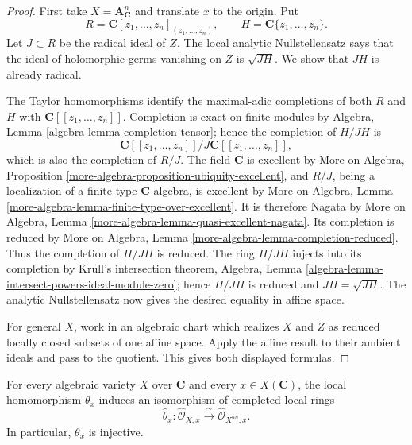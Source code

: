 \begin{proof}
First take $X=\mathbf A^n_{\mathbf C}$ and translate $x$ to the origin. Put
$$
R=\mathbf C[z_1,\ldots,z_n]_{(z_1,\ldots,z_n)},
\qquad
H=\mathbf C\{z_1,\ldots,z_n\}.
$$
Let $J \subset R$ be the radical ideal of $Z$. The local analytic
Nullstellensatz says that the ideal of holomorphic germs vanishing on $Z$ is
$\sqrt{JH}$. We show that $JH$ is already radical.

The Taylor homomorphisms identify the maximal-adic completions of both $R$ and
$H$ with $\mathbf C[[z_1,\ldots,z_n]]$. Completion is exact on finite modules
by Algebra, Lemma \ref{algebra-lemma-completion-tensor}; hence the completion
of $H/JH$ is
$$
\mathbf C[[z_1,\ldots,z_n]]/
J\mathbf C[[z_1,\ldots,z_n]],
$$
which is also the completion of $R/J$. The field $\mathbf C$ is excellent by
More on Algebra, Proposition
\ref{more-algebra-proposition-ubiquity-excellent}, and $R/J$, being a
localization of a finite type $\mathbf C$-algebra, is excellent by More on
Algebra, Lemma \ref{more-algebra-lemma-finite-type-over-excellent}. It is
therefore Nagata by More on Algebra, Lemma
\ref{more-algebra-lemma-quasi-excellent-nagata}. Its
completion is reduced by More on Algebra, Lemma
\ref{more-algebra-lemma-completion-reduced}. Thus the completion of $H/JH$ is
reduced. The ring $H/JH$ injects into its completion by Krull's intersection
theorem, Algebra, Lemma
\ref{algebra-lemma-intersect-powers-ideal-module-zero}; hence $H/JH$ is
reduced and $JH=\sqrt{JH}$. The analytic Nullstellensatz now gives the desired
equality in affine space.

For general $X$, work in an algebraic chart which realizes $X$ and $Z$ as
reduced locally closed subsets of one affine space. Apply the affine result to
their ambient ideals and pass to the quotient. This gives both displayed
formulas.
\end{proof}

\begin{theorem}
\label{theorem-analytification-completed-local-rings}
For every algebraic variety $X$ over $\mathbf C$ and every
$x \in X(\mathbf C)$, the local homomorphism $\theta_x$ induces an isomorphism
of completed local rings
$$
\widehat{\theta}_x :
\widehat{\mathcal O}_{X,x} \xrightarrow{\ \sim\ }
\widehat{\mathcal O}_{X^{an},x}.
$$
In particular, $\theta_x$ is injective.
\end{theorem}

